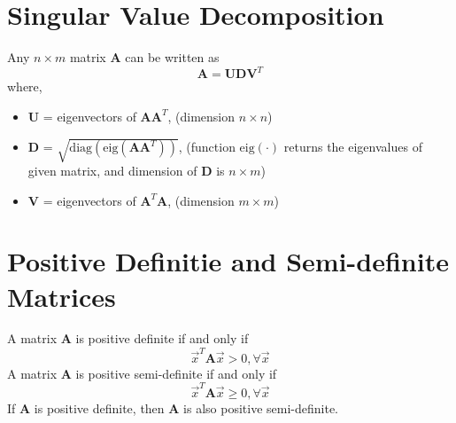 \documentclass[conference,final,11pt,technote,onecolumn]{IEEEtran}\usepackage[]{graphicx}\usepackage[]{color}
\begin{document}
\section{Singular Value Decomposition}
\label{term:singular_value_decomposition}
Any $n\times m$ matrix $\mathbf{A}$ can be written as
\[ \mathbf{A} = \mathbf{U}\mathbf{D}\mathbf{V}^T \]
where, 
\begin{itemize}
\item $\mathbf{U}$ = eigenvectors of $\mathbf{A}\mathbf{A}^T$, (dimension $n \times n$)
\item $\mathbf{D}$ = $\sqrt{\text{diag}(\text{eig}(\mathbf{A}\mathbf{A}^T))}$, (function $\text{eig}(\cdot)$ returns the eigenvalues of given matrix, and dimension of $\mathbf{D}$ is $n \times m$)
\item $\mathbf{V}$ = eigenvectors of $\mathbf{A}^T\mathbf{A}$, (dimension $m\times m$)
\end{itemize}

\section{Positive Definitie and Semi-definite Matrices}
\label{term:positive_definite_and_semi-definite}
A matrix $\mathbf{A}$ is positive definite if and only if 
\[ \vec x^T\mathbf{A}\vec x > 0, \forall \vec x \]
A matrix $\mathbf{A}$ is positive semi-definite if and only if 
\[ \vec x^T\mathbf{A}\vec x \geq 0, \forall \vec x \]
If $\mathbf{A}$ is positive definite, then $\mathbf{A}$ is also positive semi-definite.
\end{document}
